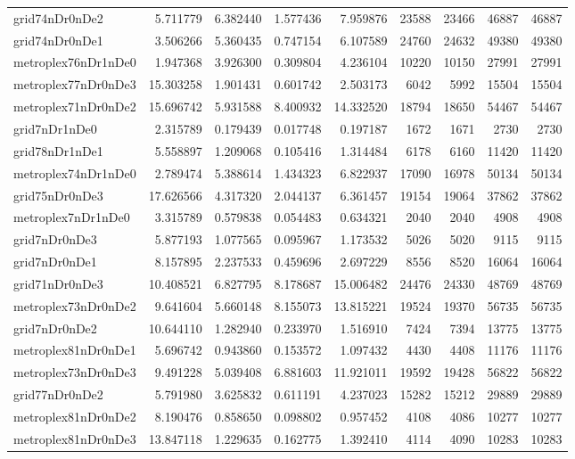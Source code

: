 \begin{longtable}{|l|r|r|r|r|r|r|r|r|}
grid74nDr0nDe2 & 5.711779 & 6.382440 & 1.577436 & 7.959876 & 23588 & 23466 & 46887 & 46887 \\
grid74nDr0nDe1 & 3.506266 & 5.360435 & 0.747154 & 6.107589 & 24760 & 24632 & 49380 & 49380 \\
metroplex76nDr1nDe0 & 1.947368 & 3.926300 & 0.309804 & 4.236104 & 10220 & 10150 & 27991 & 27991 \\
metroplex77nDr0nDe3 & 15.303258 & 1.901431 & 0.601742 & 2.503173 & 6042 & 5992 & 15504 & 15504 \\
metroplex71nDr0nDe2 & 15.696742 & 5.931588 & 8.400932 & 14.332520 & 18794 & 18650 & 54467 & 54467 \\
grid7nDr1nDe0 & 2.315789 & 0.179439 & 0.017748 & 0.197187 & 1672 & 1671 & 2730 & 2730 \\
grid78nDr1nDe1 & 5.558897 & 1.209068 & 0.105416 & 1.314484 & 6178 & 6160 & 11420 & 11420 \\
metroplex74nDr1nDe0 & 2.789474 & 5.388614 & 1.434323 & 6.822937 & 17090 & 16978 & 50134 & 50134 \\
grid75nDr0nDe3 & 17.626566 & 4.317320 & 2.044137 & 6.361457 & 19154 & 19064 & 37862 & 37862 \\
metroplex7nDr1nDe0 & 3.315789 & 0.579838 & 0.054483 & 0.634321 & 2040 & 2040 & 4908 & 4908 \\
grid7nDr0nDe3 & 5.877193 & 1.077565 & 0.095967 & 1.173532 & 5026 & 5020 & 9115 & 9115 \\
grid7nDr0nDe1 & 8.157895 & 2.237533 & 0.459696 & 2.697229 & 8556 & 8520 & 16064 & 16064 \\
grid71nDr0nDe3 & 10.408521 & 6.827795 & 8.178687 & 15.006482 & 24476 & 24330 & 48769 & 48769 \\
metroplex73nDr0nDe2 & 9.641604 & 5.660148 & 8.155073 & 13.815221 & 19524 & 19370 & 56735 & 56735 \\
grid7nDr0nDe2 & 10.644110 & 1.282940 & 0.233970 & 1.516910 & 7424 & 7394 & 13775 & 13775 \\
metroplex81nDr0nDe1 & 5.696742 & 0.943860 & 0.153572 & 1.097432 & 4430 & 4408 & 11176 & 11176 \\
metroplex73nDr0nDe3 & 9.491228 & 5.039408 & 6.881603 & 11.921011 & 19592 & 19428 & 56822 & 56822 \\
grid77nDr0nDe2 & 5.791980 & 3.625832 & 0.611191 & 4.237023 & 15282 & 15212 & 29889 & 29889 \\
metroplex81nDr0nDe2 & 8.190476 & 0.858650 & 0.098802 & 0.957452 & 4108 & 4086 & 10277 & 10277 \\
metroplex81nDr0nDe3 & 13.847118 & 1.229635 & 0.162775 & 1.392410 & 4114 & 4090 & 10283 & 10283 \\

\end{longtable}
